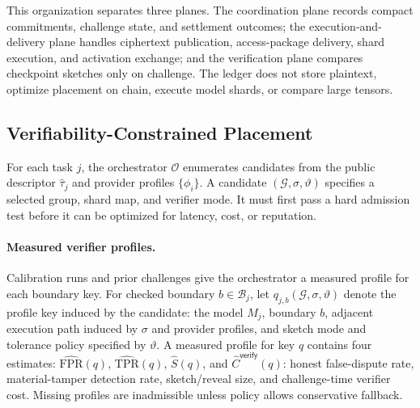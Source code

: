\documentclass[sigplan,screen,review,anonymous]{acmart}
\begin{document}
This organization separates three planes. The coordination plane records
compact commitments, challenge state, and settlement outcomes; the
execution-and-delivery plane handles ciphertext publication, access-package
delivery, shard execution, and activation exchange; and the verification plane
compares checkpoint sketches only on challenge. The ledger does not store
plaintext, optimize placement on chain, execute model shards, or compare large
tensors.

\subsection{Verifiability-Constrained Placement}
\label{subsec:placement}

For each task \(j\), the orchestrator \(\mathcal{O}\) enumerates candidates
from the public descriptor \(\widehat{\tau}_j\) and provider profiles
\(\{\phi_i\}\). A candidate \((\mathcal{G},\sigma,\vartheta)\) specifies a
selected group, shard map, and verifier mode. It must first pass a hard
admission test before it can be optimized for latency, cost, or reputation.

\paragraph{Measured verifier profiles.}
Calibration runs and prior challenges give the orchestrator a measured profile
for each boundary key. For checked boundary \(b\in\mathcal{B}_j\), let
\(q_{j,b}(\mathcal{G},\sigma,\vartheta)\) denote the profile key induced by
the candidate: the model \(M_j\), boundary \(b\), adjacent execution path
induced by \(\sigma\) and provider profiles, and sketch mode and tolerance
policy specified by \(\vartheta\). A measured profile for key
\(q\) contains four estimates: \(\widehat{\mathrm{FPR}}(q)\),
\(\widehat{\mathrm{TPR}}(q)\), \(\widehat{S}(q)\), and
\(\widehat{C}^{\mathsf{verify}}(q)\): honest false-dispute rate,
material-tamper detection rate, sketch/reveal size, and challenge-time verifier
cost. Missing profiles are inadmissible unless policy allows conservative
fallback.
\end{document}

